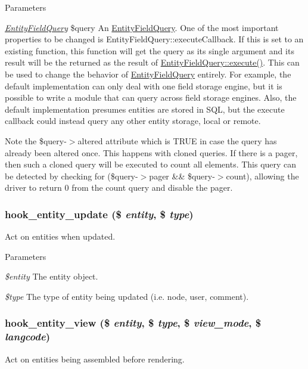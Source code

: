 \begin{DoxyParams}{Parameters}
\item[{\em \hyperlink{classEntityFieldQuery}{EntityFieldQuery}}]\$query An \hyperlink{classEntityFieldQuery}{EntityFieldQuery}. One of the most important properties to be changed is EntityFieldQuery::executeCallback. If this is set to an existing function, this function will get the query as its single argument and its result will be the returned as the result of \hyperlink{classEntityFieldQuery_ac90614418d7fb3a0c81134889fe1bcbd}{EntityFieldQuery::execute()}. This can be used to change the behavior of \hyperlink{classEntityFieldQuery}{EntityFieldQuery} entirely. For example, the default implementation can only deal with one field storage engine, but it is possible to write a module that can query across field storage engines. Also, the default implementation presumes entities are stored in SQL, but the execute callback could instead query any other entity storage, local or remote.\end{DoxyParams}
Note the \$query-\/$>$altered attribute which is TRUE in case the query has already been altered once. This happens with cloned queries. If there is a pager, then such a cloned query will be executed to count all elements. This query can be detected by checking for (\$query-\/$>$pager \&\& \$query-\/$>$count), allowing the driver to return 0 from the count query and disable the pager. \hypertarget{group__hooks_ga4b7c83c8b2e4f3719327ae794d0964ef}{
\subsubsection[{hook\_\-entity\_\-update}]{\setlength{\rightskip}{0pt plus 5cm}hook\_\-entity\_\-update (\$ {\em entity}, \/  \$ {\em type})}}
\label{group__hooks_ga4b7c83c8b2e4f3719327ae794d0964ef}
Act on entities when updated.


\begin{DoxyParams}{Parameters}
\item[{\em \$entity}]The entity object. \item[{\em \$type}]The type of entity being updated (i.e. node, user, comment). \end{DoxyParams}
\hypertarget{group__hooks_gae273ba271c2ef1192fe135afa9da5d49}{
\subsubsection[{hook\_\-entity\_\-view}]{\setlength{\rightskip}{0pt plus 5cm}hook\_\-entity\_\-view (\$ {\em entity}, \/  \$ {\em type}, \/  \$ {\em view\_\-mode}, \/  \$ {\em langcode})}}
\label{group__hooks_gae273ba271c2ef1192fe135afa9da5d49}
Act on entities being assembled before rendering.


